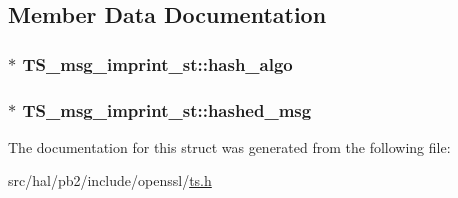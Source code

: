 \subsection{Member Data Documentation}
\subsubsection[{\texorpdfstring{hash\+\_\+algo}{hash_algo}}]{$\ast$ T\+S\+\_\+msg\+\_\+imprint\+\_\+st\+::hash\+\_\+algo}\hypertarget{struct_t_s__msg__imprint__st_aa0d4da96ba582b7b29ffe2acd192d10e}{}\label{struct_t_s__msg__imprint__st_aa0d4da96ba582b7b29ffe2acd192d10e}
\subsubsection[{\texorpdfstring{hashed\+\_\+msg}{hashed_msg}}]{$\ast$ T\+S\+\_\+msg\+\_\+imprint\+\_\+st\+::hashed\+\_\+msg}\hypertarget{struct_t_s__msg__imprint__st_a0be6581788c745f9e1d872c47d511dad}{}\label{struct_t_s__msg__imprint__st_a0be6581788c745f9e1d872c47d511dad}


The documentation for this struct was generated from the following file\+:\begin{DoxyCompactItemize}
\item 
src/hal/pb2/include/openssl/\hyperlink{ts_8h}{ts.\+h}\end{DoxyCompactItemize}
